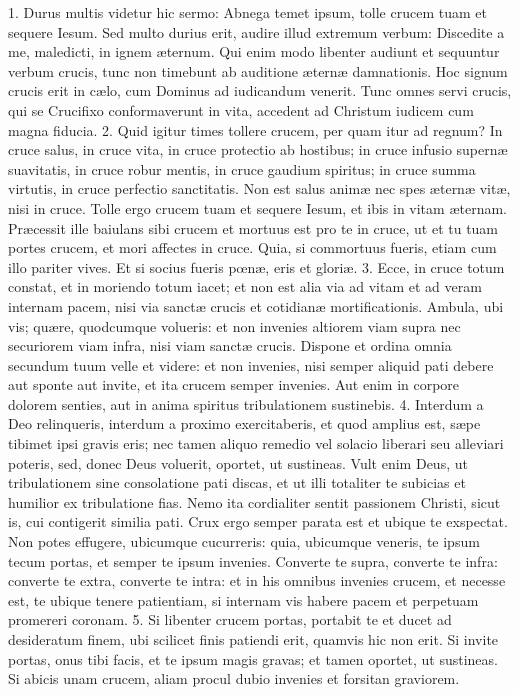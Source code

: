 1. Durus multis videtur hic sermo: Abnega temet ipsum, tolle crucem tuam et sequere Iesum. Sed multo durius erit, audire illud extremum verbum: Discedite a me, maledicti, in ignem æternum. Qui enim modo libenter audiunt et sequuntur verbum crucis, tunc non timebunt ab auditione æternæ damnationis. Hoc signum crucis erit in cælo, cum Dominus ad iudicandum venerit. Tunc omnes servi crucis, qui se Crucifixo conformaverunt in vita, accedent ad Christum iudicem cum magna fiducia.
2. Quid igitur times tollere crucem, per quam itur ad regnum? In cruce salus, in cruce vita, in cruce protectio ab hostibus; in cruce infusio supernæ suavitatis, in cruce robur mentis, in cruce gaudium spiritus; in cruce summa virtutis, in cruce perfectio sanctitatis. Non est salus animæ nec spes æternæ vitæ, nisi in cruce. Tolle ergo crucem tuam et sequere Iesum, et ibis in vitam æternam. Præcessit ille baiulans sibi crucem et mortuus est pro te in cruce, ut et tu tuam portes crucem, et mori affectes in cruce. Quia, si commortuus fueris, etiam cum illo pariter vives. Et si socius fueris pœnæ, eris et gloriæ.
3. Ecce, in cruce totum constat, et in moriendo totum iacet; et non est alia via ad vitam et ad veram internam pacem, nisi via sanctæ crucis et cotidianæ mortificationis. Ambula, ubi vis; quære, quodcumque volueris: et non invenies altiorem viam supra nec securiorem viam infra, nisi viam sanctæ crucis. Dispone et ordina omnia secundum tuum velle et videre: et non invenies, nisi semper aliquid pati debere aut sponte aut invite, et ita crucem semper invenies. Aut enim in corpore dolorem senties, aut in anima spiritus tribulationem sustinebis.
4. Interdum a Deo relinqueris, interdum a proximo exercitaberis, et quod amplius est, sæpe tibimet ipsi gravis eris; nec tamen aliquo remedio vel solacio liberari seu alleviari poteris, sed, donec Deus voluerit, oportet, ut sustineas. Vult enim Deus, ut tribulationem sine consolatione pati discas, et ut illi totaliter te subicias et humilior ex tribulatione fias. Nemo ita cordialiter sentit passionem Christi, sicut is, cui contigerit similia pati. Crux ergo semper parata est et ubique te exspectat. Non potes effugere, ubicumque cucurreris: quia, ubicumque veneris, te ipsum tecum portas, et semper te ipsum invenies. Converte te supra, converte te infra: converte te extra, converte te intra: et in his omnibus invenies crucem, et necesse est, te ubique tenere patientiam, si internam vis habere pacem et perpetuam promereri coronam.
5. Si libenter crucem portas, portabit te et ducet ad desideratum finem, ubi scilicet finis patiendi erit, quamvis hic non erit. Si invite portas, onus tibi facis, et te ipsum magis gravas; et tamen oportet, ut sustineas. Si abicis unam crucem, aliam procul dubio invenies et forsitan graviorem.
